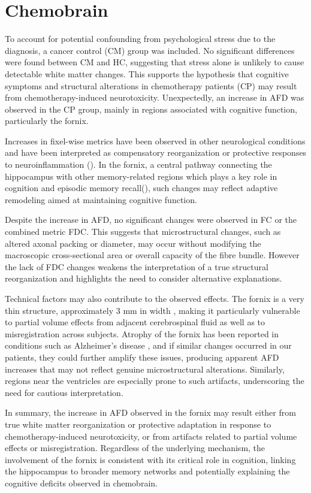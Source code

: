 \section{Chemobrain}
To account for potential confounding from psychological stress due to the diagnosis, a cancer control (CM) group was included. No significant differences were found between CM and HC, suggesting that stress alone is unlikely to cause detectable white matter changes. This supports the hypothesis that cognitive symptoms and structural alterations in chemotherapy patients (CP) may result from chemotherapy-induced neurotoxicity. Unexpectedly, an increase in AFD was observed in the CP group, mainly in regions associated with cognitive function, particularly the fornix.

Increases in fixel-wise metrics have been observed in other neurological conditions and have been interpreted as compensatory reorganization or protective responses to neuroinflammation (\cite{Verhelst2019,Andica2021}). In the fornix, a central pathway connecting the hippocampus with other memory-related regions which plays a key role in cognition and episodic memory recall(\cite{Li2022, Senova2020}), such changes may reflect adaptive remodeling aimed at maintaining cognitive function. 

Despite the increase in AFD, no significant changes were observed in FC or the combined metric FDC. This suggests that microstructural changes, such as altered axonal packing or diameter, may occur without modifying the macroscopic cross-sectional area or overall capacity of the fibre bundle. However the lack of FDC changes weakens the interpretation of a true structural reorganization and highlights the need to consider alternative explanations.

Technical factors may also contribute to the observed effects. The fornix is a very thin structure, approximately 3 mm in width \cite{Yucel2002}, making it particularly vulnerable to partial volume effects from adjacent cerebrospinal fluid as well as to misregistration across subjects. Atrophy of the fornix has been reported in conditions such as Alzheimer’s disease \cite{Ali2025}, and if similar changes occurred in our patients, they could further amplify these issues, producing apparent AFD increases that may not reflect genuine microstructural alterations. Similarly, regions near the ventricles are especially prone to such artifacts, underscoring the need for cautious interpretation.

In summary, the increase in AFD observed in the fornix may result either from true white matter reorganization or protective adaptation in response to chemotherapy-induced neurotoxicity, or from artifacts related to partial volume effects or misregistration. Regardless of the underlying mechanism, the involvement of the fornix is consistent with its critical role in cognition, linking the hippocampus to broader memory networks and potentially explaining the cognitive deficits observed in chemobrain.


